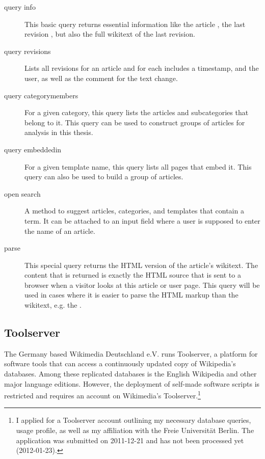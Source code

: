 \begin{description}
    \item[query info] This basic query returns essential information like the article , the last revision , but also the full wikitext of the last revision.
    \item[query revisions] Lists all revisions for an article and for each includes a timestamp, and the user, as well as the comment for the text change.
    \item[query categorymembers] For a given category, this query lists the articles and subcategories that belong to it.
    This query can be used to construct groups of articles for analysis in this thesis.
    \item[query embeddedin] For a given template name, this query lists all pages that embed it.
    This query can also be used to build a group of articles. 
    \item[open search] A method to suggest articles, categories, and templates that contain a term. 
    It can be attached to an input field where a user is supposed to enter the name of an article.
    \item[parse] This special query returns the \ac{HTML} version of the article's wikitext.
    The content that is returned is exactly the \ac{HTML} source that is sent to a browser when a visitor looks at this article or user page.
    This query will be used in cases where it is easier to parse the \ac{HTML} markup than the wikitext, e.g. the .
\end{description}

\subsection{Toolserver}\label{sub:toolserver}

The Germany based Wikimedia Deutschland e.V. runs Toolserver, a platform for software tools that can access a continuously updated copy of Wikipedia's databases. 
Among these replicated databases is the English Wikipedia and other major language editions.
However, the deployment of self-made software scripts is restricted and requires an account on Wikimedia's Toolserver.\footnote{I applied for a Toolserver account outlining my necessary database queries, usage profile, as well as my affiliation with the Freie Universit\"at Berlin. The application was submitted on 2011-12-21 and has not been processed yet (2012-01-23).}

